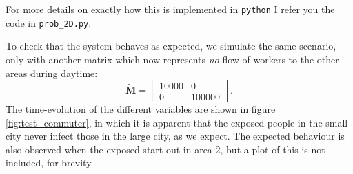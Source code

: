%
%
%    
%
%    
%
%        
%
%            
%            
%
%
%
%            
%
For more details on exactly how this is implemented in \lstinline|python| I refer you the code in \lstinline|prob_2D.py|.

To check that the system behaves as expected, we simulate the same scenario, only with another matrix which now represents \textit{no} flow of workers to the other areas during daytime:
\begin{equation}\label{eq:test_matrix}
	\mathbf{\widetilde{M}} = \begin{bmatrix}
		10000 & 0 \\
		0 & 100000 
	\end{bmatrix}.
\end{equation}
The time-evolution of the different variables are shown in figure \ref{fig:test_commuter}, in which it is apparent that the exposed people in the small city never infect those in the large city, as we expect. The expected behaviour is also observed when the exposed start out in area $2$, but a plot of this is not included, for brevity. 


